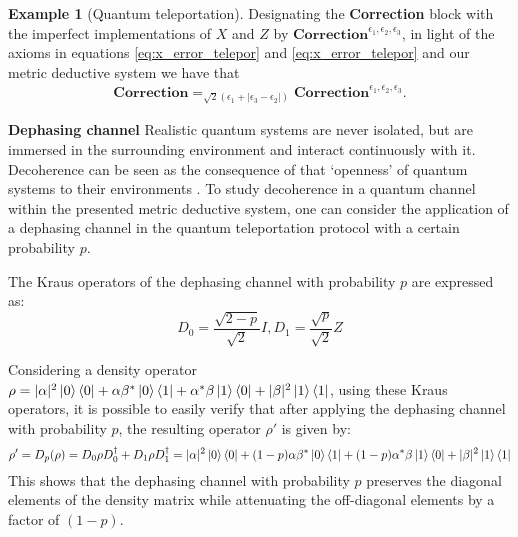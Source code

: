 \documentclass[10pt,a4paper]{amsart}
\theoremstyle{definition}
\theoremstyle{definition}
\newtheorem{example}[definition]{Example}
\theoremstyle{definition}
\theoremstyle{definition}
\theoremstyle{definition}
\theoremstyle{definition}
\begin{document}
\begin{example}[Quantum teleportation]
    Designating the \textbf{Correction} block with the imperfect implementations of $X$ and $Z$ by $\textbf{Correction}^{\epsilon_1, \epsilon_2, \epsilon_3}$, in light of the axioms in equations \eqref{eq:x_error_telepor} and \eqref{eq:x_error_telepor} and our metric deductive system we have that
    \begin{align} \label{eq:z_error_telepor}
      \textbf{Correction} =_{\sqrt{2} \left(\epsilon_1 +|\epsilon_3-\epsilon_2| \right)} \textbf{Correction}^{\epsilon_1, \epsilon_2, \epsilon_3}.
    \end{align}


     \textbf{Dephasing channel}
     Realistic quantum systems are never isolated, but are immersed in the surrounding environment and interact continuously with it. Decoherence can be seen as the consequence of that  `openness' of quantum systems to their  environments .  To study decoherence in a quantum channel within the presented metric deductive system, one can consider the application of a dephasing channel in the quantum teleportation protocol with a certain probability $p$.
     
     The Kraus operators of the dephasing channel with probability $p$ are expressed as:
     \begin{equation*}
          D_{0}= \frac{\sqrt{2-p}}{\sqrt{2}} I,  D_{1}= \frac{\sqrt{p}}{\sqrt{2}} Z
     \end{equation*}
     
     Considering a density operator $\rho=|\alpha|^{2} \ket{0} \bra{0} + \alpha \beta^{*} \ket{0} \bra{1}+ \alpha^{*} \beta \ket{1} \bra{0} + |\beta|^{2} \ket{1} \bra{1}$, using these Kraus operators, it is possible to easily verify  that after applying the dephasing channel with probability $p$, the resulting operator $\rho'$ is given by: 
     \begin{equation*} 
          \rho' = D_p(\rho)= D_{0} \rho D_{0}^{\dag} + D_{1} \rho D_{1}^{\dag} = |\alpha|^{2} \ket{0} \bra{0} +  (1-p) \alpha \beta^{*} \ket{0} \bra{1}+  (1-p) \alpha^{*}  \beta \ket{1} \bra{0} + |\beta|^{2} \ket{1} \bra{1}
     \end{equation*}
     This shows that the dephasing channel with probability $p$ preserves the diagonal elements of the density matrix while attenuating the off-diagonal elements by a factor of $(1-p)$.


\end{example}
\end{document}
